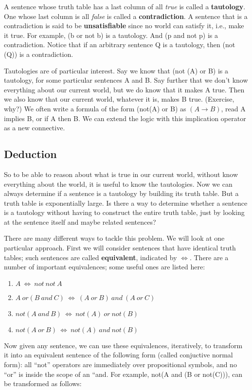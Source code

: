 A sentence whose truth table has a last column of all {\em true} is
called a {\bf tautology}.  One whose last column is all {\em false} is
called a {\bf contradiction}.  A sentence that is a contradiction is
said to be {\bf unsatisfiable} since no world can satisfy it, i.e.,
make it true.  For example, (b or not b) is a tautology.  And (p and
not p) is a contradiction.  Notice that if an arbitrary sentence Q is
a tautology, then (not (Q)) is a contradiction.

Tautologies are of particular interest.  Say we know that (not (A) or
B) is a tautology, for some particular sentences A and B.  Say further
that we don't know everything about our current world, but we do know
that it makes A true.  Then we also know that our current world,
whatever it is, makes B true.  (Exercise, why?)  We often write a
formula of the form (not(A) or B) as $(A \rightarrow B)$, read A
implies B, or if A then B.  We can extend the logic with this
implication operator as a new connective.

\subsection{Deduction}

So to be able to reason about what is true in our current world,
without know everything about the world, it is useful to know the
tautologies.  Now we can always determine if a sentence is a tautology
by building its truth table.  But a truth table is exponentially
large.  Is there a way to determine whether a sentence is a tautology
without having to construct the entire truth table, just by looking at
the sentence itself and maybe related sentences?

There are many different ways to tackle this problem.  We will look at
one particular approach.  First we will consider sentences that have
identical truth tables; such sentences are called {\bf equivalent},
indicated by $\Longleftrightarrow$.  There are a number of important
equivalences; some useful ones are listed here:
\begin{enumerate}
\item $A~ \Longleftrightarrow ~not~ not~ A$
\item $A ~or (B~ and~ C)~ \Longleftrightarrow ~(A~ or~ B)~ and~ (A~ or~ C)$
\item $not(A~and~B)~\Longleftrightarrow ~not(A)~or~not(B)$
\item $not(A~ or~ B)~ \Longleftrightarrow ~not(A)~ and~ not(B)$
\end{enumerate}
Now given any sentence, we can use these equivalences, iteratively, to
transform it into an equivalent sentence of the following form
(called conjuctive normal form): all ``not'' operators are immediately
over propositional symbols, and no ``or'' is inside the scope of an ``and.
For example, not(A and (B or not(C))), can be transformed as follows:

